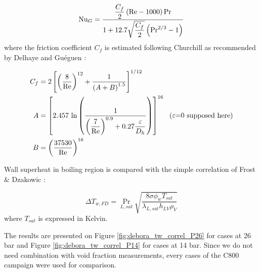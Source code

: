 \begin{equation}
\mathrm{Nu}_{G} = \frac{\dfrac{C_{f}}{2} \left( \mathrm{Re} - 1000 \right) \mathrm{Pr} }{1+12.7\sqrt{\dfrac{C_{f}}{2}} \left( \mathrm{Pr}^{2/3}-1 \right)}
\label{eq:gnielinski}
\end{equation}
where the friction coefficient $C_{f}$ is estimated following Churchill \cite{churchill_friction_1977} as recommended by Delhaye \cite{delhaye_thermohydraulique_2012} and Guéguen \cite{gueguen_contribution_2013}:

\begin{align}
C_{f} &= 2 \left[  \left( \frac{8}{\mathrm{Re}} \right)^{12} + \frac{1}{\left( A+B \right)^{1.5}}  \right]^{1/12} \\
\nonumber A &=\left[  2.457\ \mathrm{ln}\left(  \frac{1}{ \left( \dfrac{7}{\mathrm{Re}} \right)^{0.9} + 0.27 \dfrac{\varepsilon}{D_{h}} }  \right)  \right]^{16}\ \ \text{($\varepsilon$=0 supposed here)}\\
\nonumber B &= \left(  \frac{37530}{\mathrm{Re}}  \right)^{16}
\end{align}

\npar

Wall superheat in boiling region is compared with the simple correlation of Frost \& Dzakowic \cite{frost_extension_1967}:

\begin{equation}
\Delta T_{w,FD} = \Pr_{L,sat} \sqrt{\frac{8 \sigma \phi_{w} T_{sat}}{\lambda_{L,sat} h_{LV} \rho_{V}}} 
\label{eq:frost}
\end{equation}
where $T_{sat}$ is expressed in Kelvin.


\npar

The results are presented on Figure \ref{fig:debora_tw_correl_P26} for cases at 26 bar and Figure \ref{fig:debora_tw_correl_P14} for cases at 14 bar. Since we do not need combination with void fraction measurements, every cases of the C800 campaign were used for comparison.


